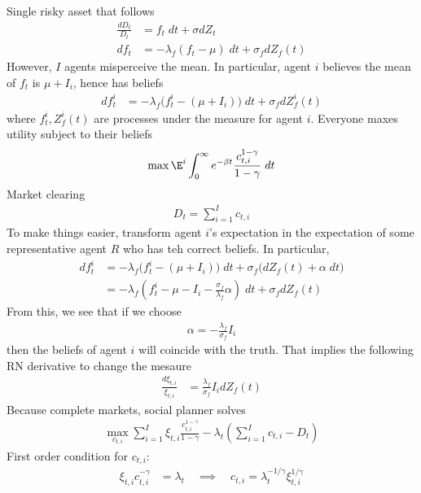 \documentclass[12pt]{article}
\theoremstyle{plain}
\theoremstyle{definition}
\theoremstyle{remark}
\begin{document}
Single risky asset that follows
\begin{align*}
  \frac{dD_t}{D_t}
  &= f_t\;dt + \sigma dZ_t
  \\
  df_t
  &= -\lambda_f(f_t-\mu)\;dt + \sigma_fdZ_f(t)
\end{align*}
However, $I$ agents misperceive the mean.
In particular, agent $i$ believes the mean of $f_t$ is $\mu+I_i$, hence
has beliefs
\begin{align*}
  df_t^i
  &= -\lambda_f\big(f_t^i-(\mu+I_i)\big)\;dt + \sigma_fdZ_f^i(t)
\end{align*}
where $f_t^i,Z_f^i(t)$ are processes under the measure for agent $i$.
Everyone maxes utility subject to their beliefs
\begin{align*}
  \max \E^i\int_0^\infty e^{-\beta t}
  \frac{c_{t,i}^{1-\gamma}}{1-\gamma}
  \;dt
\end{align*}
Market clearing
\begin{align*}
  D_t = \sum_{i=1}^I c_{t,i}
\end{align*}
To make things easier, transform agent $i$'s expectation in the
expectation of some representative agent $R$ who has teh correct
beliefs. In particular,
\begin{align*}
  df_t^i
  &=
  -\lambda_f\big(f_t^i-(\mu+I_i)\big)\;dt
  + \sigma_f\big(dZ_f(t) + \alpha \;dt\big)
  \\
  &=
  -\lambda_f\left(
    f_t^i-\mu-I_i- \frac{\sigma_f}{\lambda_f} \alpha\right)\;dt
  + \sigma_fdZ_f(t)
\end{align*}
From this, we see that if we choose
\begin{align*}
  \alpha
  =
  - \frac{\lambda_f}{\sigma_f} I_i
\end{align*}
then the beliefs of agent $i$ will coincide with the truth.
That implies the following RN derivative to change the mesaure
\begin{align*}
  \frac{d\xi_{t,i}}{\xi_{t,i}}
  &=
  \frac{\lambda_f}{\sigma_f} I_i
  dZ_f(t)
\end{align*}
Because complete markets, social planner solves
\begin{align*}
  \max_{c_{t,i}}
  \sum_{i=1}^I
  \xi_{t,i}
  \frac{c_{t,i}^{1-\gamma}}{1-\gamma}
  -\lambda_t
  \left(
  \sum_{i=1}^I c_{t,i}-D_t
  \right)
\end{align*}
First order condition for $c_{t,i}$:
\begin{align*}
  \xi_{t,i}
  c_{t,i}^{-\gamma}
  &=
  \lambda_t
  \quad\implies\quad
  c_{t,i}
  =
  \lambda_t^{-1/\gamma}
  \xi_{t,i}^{1/\gamma}
\end{align*}
\end{document}
